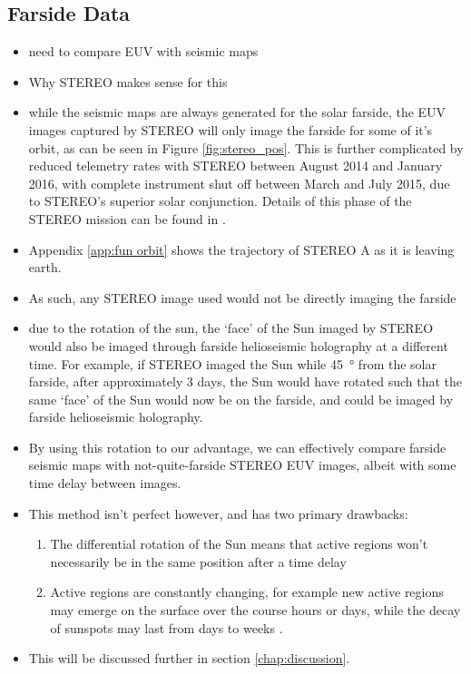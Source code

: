\documentclass[11pt,a4paper,onecolumn]{report}
\begin{document}
\subsection{Farside Data}
\begin{itemize}
  \item need to compare EUV with seismic maps
  \item Why STEREO makes sense for this
  \item while the seismic maps are always generated for the solar farside, the
        EUV images captured by STEREO will only image the farside for some of
        it's orbit, as can be seen in Figure \ref{fig:stereo_pos}. This is
        further complicated by reduced telemetry rates with STEREO between August 2014 and
        January 2016, with complete instrument shut off between March and July
        2015, due to STEREO's superior solar conjunction. Details of this phase
        of the STEREO mission can be found in \citet{ossing_stereo_2017}.
  \item Appendix \ref{app:fun orbit} shows the trajectory of STEREO A as it is
        leaving earth.
  \item As such, any STEREO image used would not be directly imaging the farside
  \item due to the rotation of the sun, the `face' of the Sun imaged by STEREO
  would also be imaged through farside helioseismic holography at a different
  time. For example, if STEREO imaged the Sun while \SI[]{45}[]{\degree} from
  the solar farside, after approximately 3 days, the Sun would have rotated
  such that the same `face' of the Sun would now be on the farside, and could be
  imaged by farside helioseismic holography.
  \item By using this rotation to our advantage, we can effectively compare
  farside seismic maps with not-quite-farside STEREO EUV images, albeit with
  some time delay between images.
  \item This method isn't perfect however, and has two primary drawbacks:
  \begin{enumerate}
    \item The differential rotation of the Sun means that active regions won't
    necessarily be in the same position after a time delay
    \item Active regions are constantly changing, for example new active regions may emerge on the surface over the course hours or days,
    while the decay of sunspots may last from days to weeks
    \citep{van_driel-gesztelyi_evolution_2015}.
  \end{enumerate}
  \item This will be discussed further in section \ref{chap:discussion}.


\end{itemize}
\end{document}
